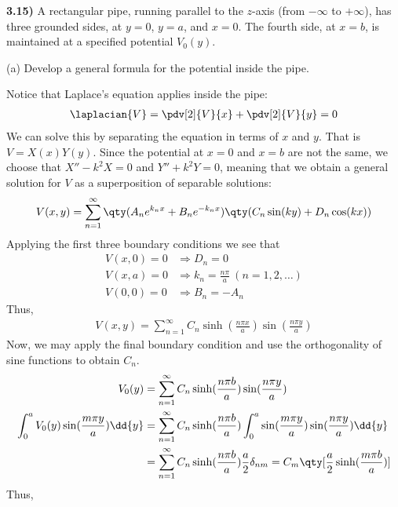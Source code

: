 \documentclass[12pt,a4paper]{article}
\newcommand{\prob}[2]{\textbf{#1)} #2}
\begin{document}
\prob{3.15}{A rectangular pipe, running parallel to the $z$-axis (from $-\infty$ to $+\infty$), has three grounded sides, at $y=0$, $y=a$, and $x=0$. The fourth side, at $x=b$, is maintained at a specified potential $V_0(y)$.}

(a) Develop a general formula for the potential inside the pipe.

Notice that Laplace's equation applies inside the pipe:
\begin{align*}
\laplacian{V} = \pdv[2]{V}{x} + \pdv[2]{V}{y} = 0
\end{align*}
We can solve this by separating the equation in terms of $x$ and $y$. That is $V = X(x)Y(y)$. Since the potential at $x = 0$ and $x = b$ are not the same, we choose that $X'' - k^2X = 0$ and $Y'' + k^2Y = 0$, meaning that we obtain a general solution for $V$ as a superposition of separable solutions:
\begin{align*}
V(x,y) = \sum_{n=1}^{\infty} \qty(A_ne^{k_nx} + B_ne^{-k_nx})\qty(C_n\sin(ky) + D_n\cos(kx))
\end{align*}
Applying the first three boundary conditions we see that
\begin{align*}
V(x,0) = 0 &\Rightarrow D_n = 0 \\
V(x,a) = 0 &\Rightarrow k_n = \frac{n\pi}{a}~(n=1,2,\hdots) \\
V(0,0) = 0 &\Rightarrow B_n = -A_n
\end{align*}
Thus,
\begin{align*}
V(x,y) = \sum_{n=1}^{\infty} C_n\sinh(\frac{n\pi x}{a})\sin(\frac{n\pi y}{a})
\end{align*}
Now, we may apply the final boundary condition and use the orthogonality of sine functions to obtain $C_n$.
\begin{align*}
V_0(y) &= \sum_{n=1}^{\infty} C_n\sinh(\frac{n\pi b}{a})\sin(\frac{n\pi y}{a}) \\
\int_{0}^{a} V_0(y)\sin(\frac{m\pi y}{a}) \dd{y} &= \sum_{n=1}^{\infty} C_n\sinh(\frac{n\pi b}{a})\int_{0}^{a} \sin(\frac{m\pi y}{a}) \sin(\frac{n\pi y}{a}) \dd{y} \\
&= \sum_{n=1}^{\infty}C_n\sinh(\frac{n\pi b}{a})\frac{a}{2}\delta_{nm} = C_m\qty[\frac{a}{2}\sinh(\frac{m\pi b}{a})]
\end{align*}
Thus,
\end{document}
